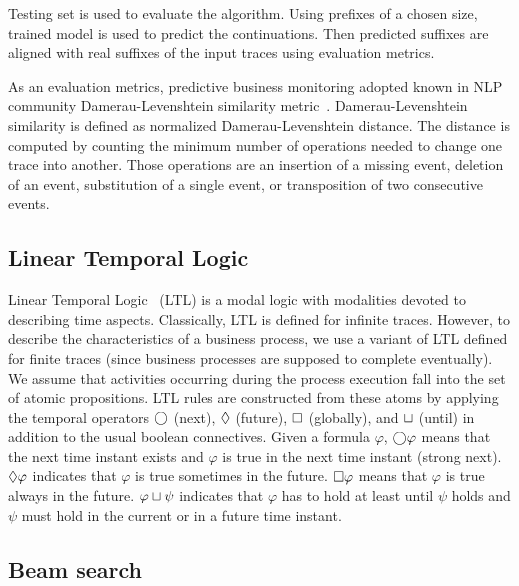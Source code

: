 
Testing set is used to evaluate the algorithm. Using prefixes of a chosen size, trained model is used to predict the continuations. Then predicted suffixes are aligned with real suffixes of the input traces using evaluation metrics.

As an evaluation metrics, predictive business monitoring adopted known in NLP community Damerau-Levenshtein similarity metric~\cite{Damerau:1964:TCD:363958.363994}. Damerau-Levenshtein similarity is defined as normalized Damerau-Levenshtein distance. The distance is computed by counting the minimum number of operations needed to change one trace into another. Those operations are an insertion of a missing event, deletion of an event, substitution of a single event, or transposition of two consecutive events.

 




\subsection{Linear Temporal Logic}

Linear Temporal Logic~\cite{Pnueli77} (LTL) is a modal logic with modalities devoted to describing time aspects. Classically, LTL is defined for infinite traces. However, to describe the characteristics of a business process, we use a variant of LTL defined for finite traces (since business processes are supposed to complete eventually).
%
We assume that activities occurring during the process execution fall into the set of atomic propositions. LTL rules are constructed from these atoms by applying the temporal operators $\bigcirc$ (next), $\lozenge$ (future), $\square$ (globally), and $\sqcup$ (until) in addition to the usual boolean connectives. Given a formula $\varphi$, $\bigcirc \varphi$ means that the next time instant exists and $\varphi$ is true in the next time instant (strong next). $\lozenge \varphi$ indicates that $\varphi$ is true sometimes in the future. $\square \varphi$ means that $\varphi$ is true always in the future. $\varphi \sqcup \psi$ indicates that $\varphi$ has to hold at least until $\psi$  holds and $\psi$ must hold in the current or in a future time instant.

\subsection{Beam search} \label{beam-search}

